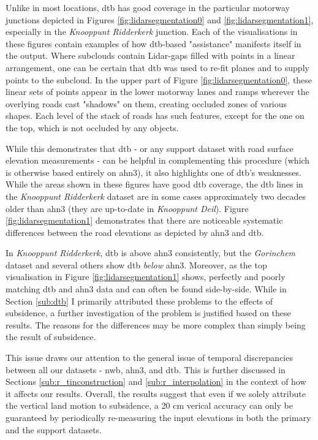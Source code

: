 Unlike in most locations, \ac{dtb} has good coverage in the particular motorway junctions depicted in Figures \ref{fig:lidarsegmentation0} and \ref{fig:lidarsegmentation1}, especially in the \textit{Knooppunt Ridderkerk} junction. Each of the visualisations in these figures contain examples of how \ac{dtb}-based "assistance" manifests itself in the output. Where subclouds contain Lidar-gaps filled with points in a linear arrangement, one can be certain that \ac{dtb} was used to re-fit planes and to supply points to the subcloud. In the upper part of Figure \ref{fig:lidarsegmentation0}, these linear sets of points appear in the lower motorway lanes and ramps wherever the overlying roads cast "shadows" on them, creating occluded zones of various shapes. Each level of the stack of roads has such features, except for the one on the top, which is not occluded by any objects.

While this demonstrates that \ac{dtb} - or any support dataset with road surface elevation measurements - can be helpful in complementing this procedure (which is otherwise based entirely on \ac{ahn3}), it also highlights one of \ac{dtb}'s weaknesses. While the areas shown in these figures have good \ac{dtb} coverage, the \ac{dtb} lines in the \textit{Knooppunt Ridderkerk} dataset are in some cases approximately two decades older than \ac{ahn3} (they are up-to-date in \textit{Knooppunt Deil}). Figure \ref{fig:lidarsegmentation1} demonstrates that there are noticeable systematic differences between the road elevations as depicted by \ac{ahn3} and \ac{dtb}.

In \textit{Knooppunt Ridderkerk}, \ac{dtb} is above \ac{ahn3} consistently, but the \textit{Gorinchem} dataset and several others show \ac{dtb} \textit{below} \ac{ahn3}. Moreover, as the top visualisation in Figure \ref{fig:lidarsegmentation1} shows, perfectly and poorly matching \ac{dtb} and \ac{ahn3} data and can often be found side-by-side. While in Section \ref{sub:dtb} I primarily attributed these problems to the effects of subsidence, a further investigation of the problem is justified based on these results. The reasons for the differences may be more complex than simply being the result of subsidence.

This issue draws our attention to the general issue of temporal discrepancies between all our datasets - \ac{nwb}, \ac{ahn3}, and \ac{dtb}. This is further discussed in Sections \ref{sub:r_tinconstruction} and \ref{sub:r_interpolation} in the context of how it affects our results. Overall, the results suggest that even if we solely attribute the vertical land motion to subsidence, a 20 cm verical accuracy can only be guaranteed by periodically re-measuring the input elevations in both the primary and the support datasets.

